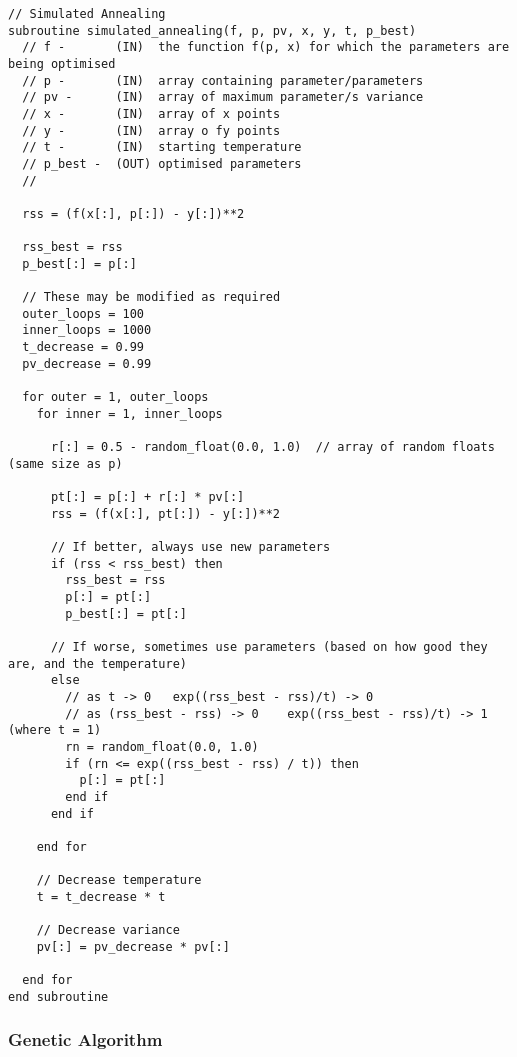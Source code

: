 \begin{lstlisting}[style=sPseudo,caption={Simple simulated annealing subroutine}]
// Simulated Annealing
subroutine simulated_annealing(f, p, pv, x, y, t, p_best)
  // f -       (IN)  the function f(p, x) for which the parameters are being optimised
  // p -       (IN)  array containing parameter/parameters
  // pv -      (IN)  array of maximum parameter/s variance
  // x -       (IN)  array of x points
  // y -       (IN)  array o fy points
  // t -       (IN)  starting temperature
  // p_best -  (OUT) optimised parameters
  //

  rss = (f(x[:], p[:]) - y[:])**2 
  
  rss_best = rss
  p_best[:] = p[:]
  
  // These may be modified as required
  outer_loops = 100
  inner_loops = 1000
  t_decrease = 0.99
  pv_decrease = 0.99
  
  for outer = 1, outer_loops
    for inner = 1, inner_loops
    
      r[:] = 0.5 - random_float(0.0, 1.0)  // array of random floats (same size as p)
      
      pt[:] = p[:] + r[:] * pv[:]
      rss = (f(x[:], pt[:]) - y[:])**2 
      
      // If better, always use new parameters
      if (rss < rss_best) then
        rss_best = rss
        p[:] = pt[:]
        p_best[:] = pt[:]
        
      // If worse, sometimes use parameters (based on how good they are, and the temperature)
      else      
        // as t -> 0   exp((rss_best - rss)/t) -> 0
        // as (rss_best - rss) -> 0    exp((rss_best - rss)/t) -> 1  (where t = 1) 
        rn = random_float(0.0, 1.0)
        if (rn <= exp((rss_best - rss) / t)) then
          p[:] = pt[:]
        end if
      end if     
      
    end for
    
    // Decrease temperature
    t = t_decrease * t
    
    // Decrease variance
    pv[:] = pv_decrease * pv[:]
    
  end for
end subroutine
\end{lstlisting}










\subsubsection{Genetic Algorithm}

